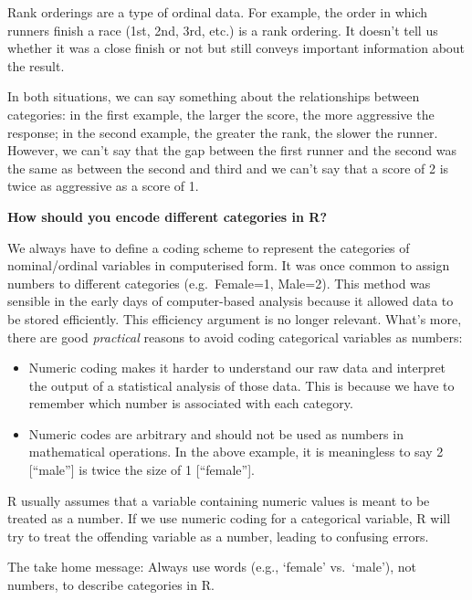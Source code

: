 \documentclass[
]{book}
\newenvironment{greybox}{
  \definecolor{shadecolor}{rgb}{0.95,0.95,0.95}  %
  \color{black}
  \begin{shaded}}
 {\end{shaded}}
\newenvironment{infobox}[1]
  {
  \begin{itemize}
  \renewcommand{\labelitemi}{
    \raisebox{-.7\height}[0pt][0pt]{
      {\setkeys{Gin}{width=3em,keepaspectratio}
        \texttt{[image: images/\#1]}}
    }
  }
  \setlength{\fboxsep}{1em}
  \begin{greybox}
  \item
  }
  {
  \end{greybox}
  \end{itemize}
  }
\begin{document}
Rank orderings are a type of ordinal data. For example, the order in which runners finish a race (1st, 2nd, 3rd, etc.) is a rank ordering. It doesn't tell us whether it was a close finish or not but still conveys important information about the result.

In both situations, we can say something about the relationships between categories: in the first example, the larger the score, the more aggressive the response; in the second example, the greater the rank, the slower the runner. However, we can't say that the gap between the first runner and the second was the same as between the second and third and we can't say that a score of 2 is twice as aggressive as a score of 1.

\begin{infobox}{warning}
\textbf{How should you encode different categories in R?}

We always have to define a coding scheme to represent the categories of nominal/ordinal variables in computerised form. It was once common to assign numbers to different categories (e.g.~Female=1, Male=2). This method was sensible in the early days of computer-based analysis because it allowed data to be stored efficiently. This efficiency argument is no longer relevant. What's more, there are good \emph{practical} reasons to avoid coding categorical variables as numbers:

\begin{itemize}
\item
  Numeric coding makes it harder to understand our raw data and interpret the output of a statistical analysis of those data. This is because we have to remember which number is associated with each category.
\item
  Numeric codes are arbitrary and should not be used as numbers in mathematical operations. In the above example, it is meaningless to say 2 {[}``male''{]} is twice the size of 1 {[}``female''{]}.
\end{itemize}

R usually assumes that a variable containing numeric values is meant to be treated as a number. If we use numeric coding for a categorical variable, R will try to treat the offending variable as a number, leading to confusing errors.

The take home message: Always use words (e.g., `female' vs.~`male'), not numbers, to describe categories in R.

\end{infobox}
\end{document}
